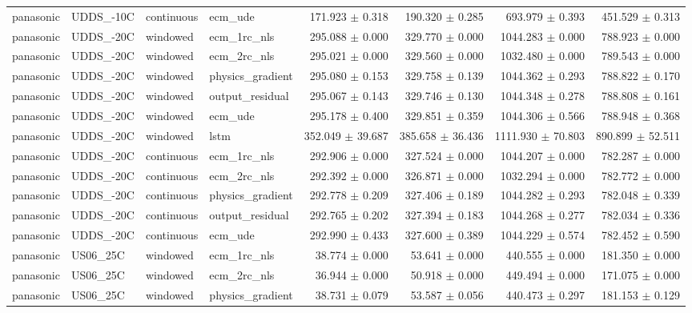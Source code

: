 \begin{longtable}{llllrrrr}
panasonic & UDDS\_-10C & continuous & ecm\_ude & 171.923 $\pm$ 0.318 & 190.320 $\pm$ 0.285 & 693.979 $\pm$ 0.393 & 451.529 $\pm$ 0.313 \\
panasonic & UDDS\_-20C & windowed & ecm\_1rc\_nls & 295.088 $\pm$ 0.000 & 329.770 $\pm$ 0.000 & 1044.283 $\pm$ 0.000 & 788.923 $\pm$ 0.000 \\
panasonic & UDDS\_-20C & windowed & ecm\_2rc\_nls & 295.021 $\pm$ 0.000 & 329.560 $\pm$ 0.000 & 1032.480 $\pm$ 0.000 & 789.543 $\pm$ 0.000 \\
panasonic & UDDS\_-20C & windowed & physics\_gradient & 295.080 $\pm$ 0.153 & 329.758 $\pm$ 0.139 & 1044.362 $\pm$ 0.293 & 788.822 $\pm$ 0.170 \\
panasonic & UDDS\_-20C & windowed & output\_residual & 295.067 $\pm$ 0.143 & 329.746 $\pm$ 0.130 & 1044.348 $\pm$ 0.278 & 788.808 $\pm$ 0.161 \\
panasonic & UDDS\_-20C & windowed & ecm\_ude & 295.178 $\pm$ 0.400 & 329.851 $\pm$ 0.359 & 1044.306 $\pm$ 0.566 & 788.948 $\pm$ 0.368 \\
panasonic & UDDS\_-20C & windowed & lstm & 352.049 $\pm$ 39.687 & 385.658 $\pm$ 36.436 & 1111.930 $\pm$ 70.803 & 890.899 $\pm$ 52.511 \\
panasonic & UDDS\_-20C & continuous & ecm\_1rc\_nls & 292.906 $\pm$ 0.000 & 327.524 $\pm$ 0.000 & 1044.207 $\pm$ 0.000 & 782.287 $\pm$ 0.000 \\
panasonic & UDDS\_-20C & continuous & ecm\_2rc\_nls & 292.392 $\pm$ 0.000 & 326.871 $\pm$ 0.000 & 1032.294 $\pm$ 0.000 & 782.772 $\pm$ 0.000 \\
panasonic & UDDS\_-20C & continuous & physics\_gradient & 292.778 $\pm$ 0.209 & 327.406 $\pm$ 0.189 & 1044.282 $\pm$ 0.293 & 782.048 $\pm$ 0.339 \\
panasonic & UDDS\_-20C & continuous & output\_residual & 292.765 $\pm$ 0.202 & 327.394 $\pm$ 0.183 & 1044.268 $\pm$ 0.277 & 782.034 $\pm$ 0.336 \\
panasonic & UDDS\_-20C & continuous & ecm\_ude & 292.990 $\pm$ 0.433 & 327.600 $\pm$ 0.389 & 1044.229 $\pm$ 0.574 & 782.452 $\pm$ 0.590 \\
panasonic & US06\_25C & windowed & ecm\_1rc\_nls & 38.774 $\pm$ 0.000 & 53.641 $\pm$ 0.000 & 440.555 $\pm$ 0.000 & 181.350 $\pm$ 0.000 \\
panasonic & US06\_25C & windowed & ecm\_2rc\_nls & 36.944 $\pm$ 0.000 & 50.918 $\pm$ 0.000 & 449.494 $\pm$ 0.000 & 171.075 $\pm$ 0.000 \\
panasonic & US06\_25C & windowed & physics\_gradient & 38.731 $\pm$ 0.079 & 53.587 $\pm$ 0.056 & 440.473 $\pm$ 0.297 & 181.153 $\pm$ 0.129 \\

\end{longtable}
